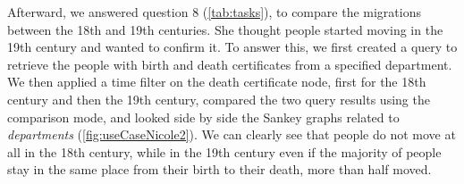 Afterward, we answered question 8 (\autoref{tab:tasks}),
to compare the migrations between the 18th and 19th centuries. She thought people started moving in the 19th century and wanted to confirm it. To answer this, we first created a query to retrieve the people with birth and death certificates from a specified department. We then applied a time filter on the death certificate node, first for the 18th century and then the 19th century, compared the two query results using the comparison mode, and looked side by side the Sankey graphs related to \textit{departments} (\autoref{fig:useCaseNicole2}). We can clearly see that people do not move at all in the 18th century, while in the 19th century even if the majority of people stay in the same place from their birth to their death, more than half moved.%

